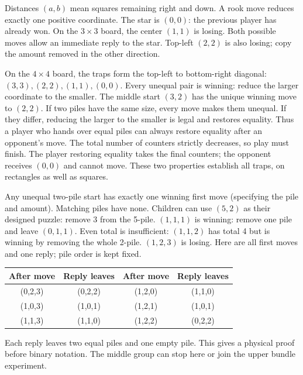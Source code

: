 \documentclass[11pt]{article}
\begin{document}
\newpage

Distances $(a,b)$ mean squares remaining right and down. A rook move reduces exactly one positive coordinate. The star is $(0,0)$: the previous player has already won. On the $3\times3$ board, the center $(1,1)$ is losing. Both possible moves allow an immediate reply to the star. Top-left $(2,2)$ is also losing; copy the amount removed in the other direction.

On the $4\times4$ board, the traps form the top-left to bottom-right diagonal: $(3,3),(2,2),(1,1),(0,0)$. Every unequal pair is winning: reduce the larger coordinate to the smaller. The middle start $(3,2)$ has the unique winning move to $(2,2)$.
If two piles have the same size, every move makes them unequal. If they differ, reducing the larger to the smaller is legal and restores equality. Thus a player who hands over equal piles can always restore equality after an opponent's move. The total number of counters strictly decreases, so play must finish. The player restoring equality takes the final counters; the opponent receives $(0,0)$ and cannot move. These two properties establish all traps, on rectangles as well as squares.

Any unequal two-pile start has exactly one winning first move (specifying the pile and amount). Matching piles have none. Children can use $(5,2)$ as their designed puzzle: remove 3 from the 5-pile.
$(1,1,1)$ is winning: remove one pile and leave $(0,1,1)$. Even total is insufficient: $(1,1,2)$ has total 4 but is winning by removing the whole 2-pile. $(1,2,3)$ is losing. Here are all first moves and one reply; pile order is kept fixed.
\begin{center}\renewcommand{\arraystretch}{1.35}\begin{tabular}{c|c@{\qquad}c|c}After move&Reply leaves&After move&Reply leaves\\\hline(0,2,3)&(0,2,2)&(1,2,0)&(1,1,0)\\(1,0,3)&(1,0,1)&(1,2,1)&(1,0,1)\\(1,1,3)&(1,1,0)&(1,2,2)&(0,2,2)\end{tabular}\end{center}
Each reply leaves two equal piles and one empty pile. This gives a physical proof before binary notation. The middle group can stop here or join the upper bundle experiment.
\end{document}
